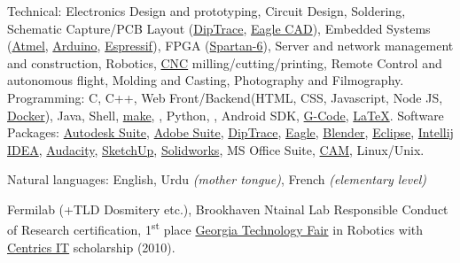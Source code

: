 \documentclass[10pt,letterpaper]{article}
\begin{document}
\inlineheadsection  %
  {Technical:}
  {Electronics Design and prototyping,
   Circuit Design, Soldering,
   Schematic Capture/PCB Layout
    (\href{http://diptrace.com/}{DipTrace},
    \href{http://www.cadsoftusa.com/}{Eagle CAD}),
   Embedded Systems
    (\href{http://www.atmel.com/}{Atmel},
    \href{http://www.arduino.cc/}{Arduino},
    \href{https://espressif.com/}{Espressif}),
   FPGA
    (\href{http://www.xilinx.com/products/silicon-devices/fpga/spartan-6.html}{Spartan-6}),
   Server and network management and construction,
   Robotics,
   \href{http://en.wikipedia.org/wiki/Numerical_control}{CNC} milling/cutting/printing,
   Remote Control and autonomous flight,
   Molding and Casting,
   Photography and Filmography.
  }
  \vspace{0.5em}
  \inlineheadsection
  {Programming:}
  {C,
   C++,
   Web Front/Backend(HTML, CSS, Javascript, Node JS, \href{https://www.docker.com/}{Docker}),
   Java,
   Shell,
   \href{https://www.gnu.org/software/make/}{make},
   ,
   Python,
   ,
   Android SDK,
   \href{http://en.wikipedia.org/wiki/G-code}{G-Code},
   \href{http://www.latex-project.org}{\LaTeX}.
  }
    \vspace{0.5em}
  \inlineheadsection
  {Software Packages:}
  {\href{http://www.autodesk.com/}{Autodesk Suite},
   \href{http://www.adobe.com/}{Adobe Suite},
   \href{http://diptrace.com/}{DipTrace},
   \href{http://www.cadsoftusa.com/}{Eagle},
   \href{http://www.blender.org/}{Blender},
   \href{https://www.eclipse.org/}{Eclipse},
   \href{http://www.jetbrains.com/idea/}{Intellij IDEA},
   \href{http://audacity.sourceforge.net/}{Audacity},
   \href{http://www.sketchup.com/}{SketchUp},
   \href{http://www.solidworks.com/}{Solidworks},
   MS Office Suite,
   \href{http://en.wikipedia.org/wiki/Computer-aided_manufacturing}{CAM},
   Linux/Unix.}

\vspace{0.5em}
\inlineheadsection
  {Natural languages:}
  {English, Urdu \emph{(mother tongue)}, French \emph{(elementary level)}}

\spacedhrule{1.6em}{-0.4em}

  {Fermilab (+TLD Dosmitery etc.), Brookhaven Ntainal Lab\href{https://www.citiprogram.org/}{} Responsible Conduct of Research certification,  1\textsuperscript{st} place \href{http://www.gatechfair.org/}{Georgia Technology Fair} in Robotics with \href{http://www.centricsit.com/}{Centrics IT} scholarship (2010).}
\end{document}
